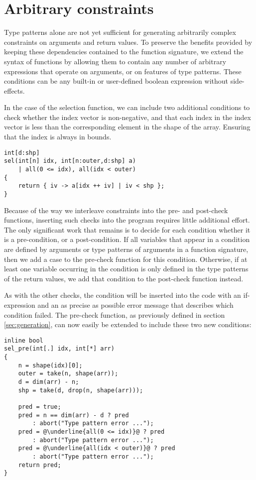 
\section{Arbitrary constraints}

Type patterns alone are not yet sufficient for generating arbitrarily complex constraints on arguments and return values.
To preserve the benefits provided by keeping these dependencies contained to the function signature, we extend the syntax of functions by allowing them to contain any number of arbitrary expressions that operate on arguments, or on features of type patterns.
These conditions can be any built-in or user-defined boolean expression without side-effects.

In the case of the selection function, we can include two additional conditions to check whether the index vector is non-negative, and that each index in the index vector is less than the corresponding element in the shape of the array.
Ensuring that the index is always in bounds.
\begin{lstlisting}
int[d:shp]
sel(int[n] idx, int[n:outer,d:shp] a)
    | all(0 <= idx), all(idx < outer)
{
    return { iv -> a[idx ++ iv] | iv < shp };
}
\end{lstlisting}

\noindent
Because of the way we interleave constraints into the pre- and post-check functions, inserting such checks into the program requires little additional effort.
The only significant work that remains is to decide for each condition whether it is a pre-condition, or a post-condition.
If all variables that appear in a condition are defined by arguments or type patterns of arguments in a function signature, then we add a case to the pre-check function for this condition.
Otherwise, if at least one variable occurring in the condition is only defined in the type patterns of the return values, we add that condition to the post-check function instead.

As with the other checks, the condition will be inserted into the code with an if-expression and an as precise as possible error message that describes which condition failed.
The pre-check function, as previously defined in section \ref{sec:generation}, can now easily be extended to include these two new conditions:
\begin{lstlisting}[escapechar=@]
inline bool
sel_pre(int[.] idx, int[*] arr)
{
    n = shape(idx)[0];
    outer = take(n, shape(arr));
    d = dim(arr) - n;
    shp = take(d, drop(n, shape(arr)));

    pred = true;
    pred = n == dim(arr) - d ? pred
        : abort("Type pattern error ...");
    pred = @\underline{all(0 <= idx)}@ ? pred
        : abort("Type pattern error ...");
    pred = @\underline{all(idx < outer)}@ ? pred
        : abort("Type pattern error ...");
    return pred;
}
\end{lstlisting}

